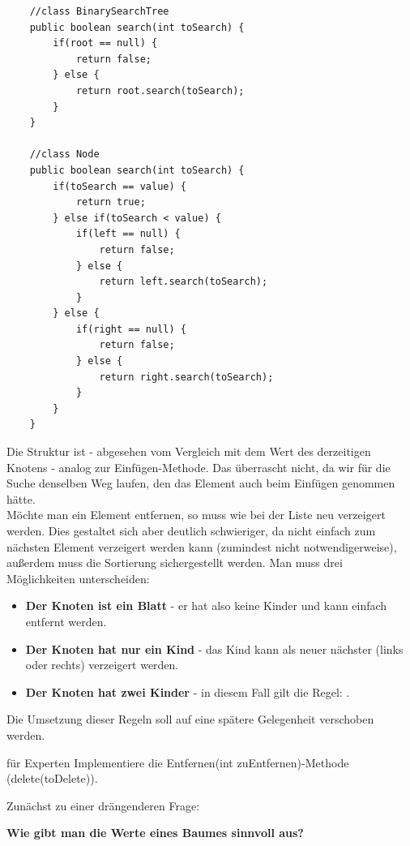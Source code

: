 \documentclass{article}
\begin{document}
\begin{verbatim}
    //class BinarySearchTree 
    public boolean search(int toSearch) {
        if(root == null) {
            return false;
        } else {
            return root.search(toSearch);
        }
    }

    //class Node 
    public boolean search(int toSearch) {
        if(toSearch == value) {
            return true;
        } else if(toSearch < value) {
            if(left == null) {
                return false;
            } else {
                return left.search(toSearch);
            }
        } else {
            if(right == null) {
                return false;
            } else {
                return right.search(toSearch);
            }
        }
    }
\end{verbatim}
Die Struktur ist - abgesehen vom Vergleich mit dem Wert des derzeitigen Knotens - analog zur Einfügen-Methode. Das überrascht nicht, da wir für die Suche denselben Weg laufen, den das Element auch beim Einfügen genommen hätte. \\
Möchte man ein Element entfernen, so muss wie bei der Liste neu verzeigert werden. Dies gestaltet sich aber deutlich schwieriger, da nicht einfach zum nächsten Element verzeigert werden kann (zumindest nicht notwendigerweise), außerdem muss die Sortierung sichergestellt werden. Man muss drei Möglichkeiten unterscheiden:
\begin{itemize}
    \item \textbf{Der Knoten ist ein Blatt} - er hat also keine Kinder und kann einfach entfernt werden.
    \item \textbf{Der Knoten hat nur ein Kind} - das Kind kann als neuer nächster (links oder rechts) verzeigert werden.
    \item \textbf{Der Knoten hat zwei Kinder} - in diesem Fall gilt die Regel: .
\end{itemize}

Die Umsetzung dieser Regeln soll auf eine spätere Gelegenheit verschoben werden.

\begin{task}{für Experten}
    Implementiere die Entfernen(int zuEntfernen)-Methode (delete(toDelete)).
\end{task}

Zunächst zu einer drängenderen Frage:
\begin{center}
    \textbf{Wie gibt man die Werte eines Baumes sinnvoll aus?}
\end{center}
\end{document}
